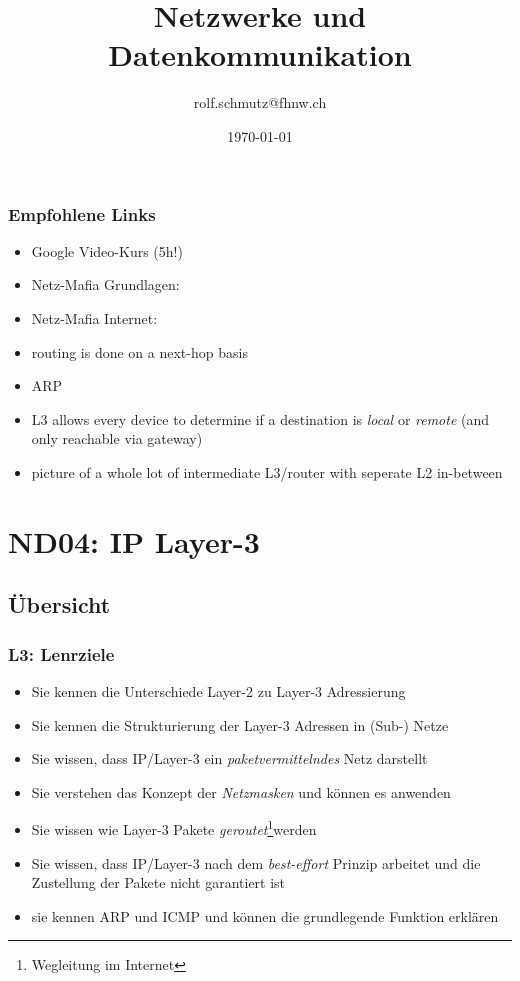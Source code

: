 \documentclass{beamer}
\date{\today}
\author{rolf.schmutz@fhnw.ch}
\institute{FHNW}
\title {Netzwerke und Datenkommunikation}
\begin{document}


\begin{frame}
\frametitle{Empfohlene Links}
\begin{itemize}
  \item Google Video-Kurs (5h!) 
  \item Netz-Mafia Grundlagen: 
  \item Netz-Mafia Internet: 
\end{itemize}

\begin{tiny}

\begin{itemize}
  \item routing is done on a next-hop basis
  \item ARP
  \item L3 allows every device to determine if a destination is {\em local} or {\em remote} (and only reachable via gateway)
  \item picture of a whole lot of intermediate L3/router with seperate L2 in-between
\end{itemize}
\end{tiny}
\end{frame}



\section{ND04: IP Layer-3}
\subsection{\"Ubersicht}

\begin{frame}
\frametitle{L3: Lenrziele}
\begin{itemize}
	\item{Sie kennen die Unterschiede Layer-2 zu Layer-3 Adressierung}
	\item{Sie kennen die Strukturierung der Layer-3 Adressen in (Sub-) Netze}
	\item{Sie wissen, dass IP/Layer-3 ein {\em paketvermittelndes} Netz darstellt}
	\item{Sie verstehen das Konzept der {\em Netzmasken} und k\"onnen es anwenden}
	\item{Sie wissen wie Layer-3 Pakete {\em geroutet}\footnote{Wegleitung im Internet}werden}
	\item{Sie wissen, dass IP/Layer-3 nach dem {\em best-effort} Prinzip arbeitet und die Zustellung der Pakete nicht garantiert ist}
	\item sie kennen ARP und ICMP und k\"onnen die grundlegende Funktion erkl\"aren
\end{itemize}
\end{frame}
\end{document}
